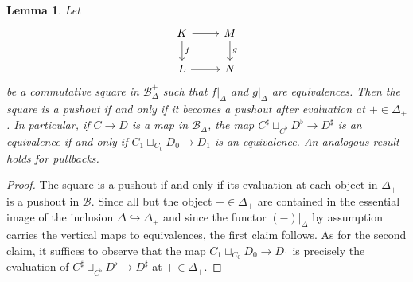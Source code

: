 \documentclass[reqno]{amsart}
\numberwithin{equation}{subsection}
\theoremstyle{plain}
\newtheorem{lemma}[equation]{Lemma}
\theoremstyle{definition}
\let\scr=\mathcal
\let\into=\hookrightarrow
\def\BB{\scr B}
\newcommand{\Simp}[1]{#1_{\Delta}}
\newcommand{\mSimp}[1]{#1_{\Delta}^+}
\begin{document}
\begin{lemma}
	\label{lem:pushoutProductEquivalenceMarked}
	Let
	\begin{equation*}
	\begin{tikzcd}
	K\arrow[r]\arrow[d, "f"] & M\arrow[d, "g"]\\
	L\arrow[r] & N
	\end{tikzcd}
	\end{equation*}
	be a commutative square in $\mSimp\BB$ such that $f\vert_{\Delta}$ and $g\vert_{\Delta}$ are equivalences. Then the square is a pushout if and only if it becomes a pushout after evaluation at $+\in\Delta_+$. 
	In particular, if $C\to D$ is a map in $\Simp\BB$, the map $C^\sharp\sqcup_{C^\flat}D^\flat\to D^\sharp$ is an equivalence if and only if $C_1\sqcup_{C_0}D_0\to D_1$ is an equivalence. An analogous result holds for pullbacks.
\end{lemma}
\begin{proof}
	The square is a pushout if and only if its evaluation at each object in $\Delta_+$ is a pushout in $\BB$. Since all but the object $+\in\Delta_+$ are contained in the essential image of the inclusion $\Delta\into\Delta_+$ and since the functor $(-)\vert_{\Delta}$ by assumption carries the vertical maps to equivalences, the first claim follows. As for the second claim, it suffices to observe that the map $C_1\sqcup_{C_0}D_0\to D_1$ is precisely the evaluation of $C^\sharp\sqcup_{C^\flat}D^\flat\to D^\sharp$ at $+\in\Delta_+$.
\end{proof}
\end{document}
